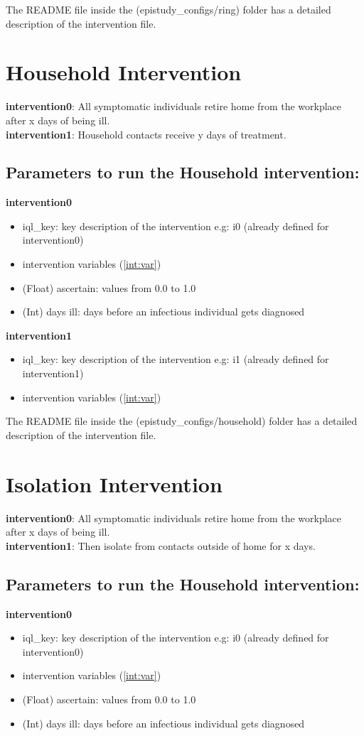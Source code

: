 \documentclass[11pt]{article}
\begin{document}
The README file inside the (epistudy\_configs/ring) folder has a detailed description of the intervention file.

\section{Household Intervention} 
\textbf{intervention0}: All symptomatic individuals retire home from the workplace after x days of being ill.\\
\textbf{intervention1}: Household contacts receive y days of treatment.

\subsection{Parameters to run the Household intervention:}
\textbf{intervention0}
\begin{itemize}
\item iql\_key: key description of the intervention e.g: i0 (already defined for intervention0)
\item intervention variables (\ref{int:var})
\item (Float) ascertain: values from 0.0 to 1.0
\item (Int) days ill: days before an infectious individual gets diagnosed 
\end{itemize}

\textbf{intervention1}
\begin{itemize}
\item iql\_key: key description of the intervention e.g: i1 (already defined for intervention1)
\item intervention variables (\ref{int:var})
\end{itemize}

The README file inside the (epistudy\_configs/household) folder has a detailed description of the intervention file.

\section{Isolation Intervention} 
\textbf{intervention0}: All symptomatic individuals retire home from the workplace after x days of being ill.\\
\textbf{intervention1}: Then isolate from contacts outside of home for x days.

\subsection{Parameters to run the Household intervention:}
\textbf{intervention0}
\begin{itemize}
\item iql\_key: key description of the intervention e.g: i0 (already defined for intervention0)
\item intervention variables (\ref{int:var})
\item (Float) ascertain: values from 0.0 to 1.0
\item (Int) days ill: days before an infectious individual gets diagnosed 
\end{itemize}
\end{document}
